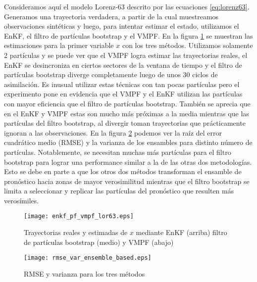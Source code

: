 Consideramos aquí el modelo Lorenz-63 descrito por las ecuaciones \ref{eq:lorenz63}. Generamos una trayectoria verdadera, a partir de la cual muestreamos observaciones sintéticas y luego, para intentar estimar el estado, utilizamos el EnKF, el filtro de partículas bootstrap y el VMPF. En la figura \ref{fig:enkf_pf_vmpf_lor63} se muestran las estimaciones para la primer variable $x$ con los tres métodos. Utilizamos solamente 2 partículas y se puede ver que el VMPF logra estimar las trayectorias reales, el EnKF se desincroniza en ciertos sectores de la ventana de tiempo y el filtro de partículas bootstrap diverge completamente luego de unos 30 ciclos de asimilación. Es inusual utilizar estas técnicas con tan pocas partículas pero el experimento pone en evidencia que el VMPF y el EnKF utilizan las partículas con mayor eficiencia que el filtro de partículas bootstrap. También se aprecia que en el EnKF y VMPF estas son mucho más próximas a la media mientras que las partículas del filtro bootstrap, al divergir toman trayectorias que prácticamente ignoran a las observaciones. En la figura \ref{fig:rmse_var_ensemble_based} podemos ver la raíz del error cuadrático medio (RMSE) y la varianza de los ensambles para distinto número de partículas. Notablemente, se necesitan muchas más partículas para el filtro bootstrap para lograr una performance similar a la de las otras dos metodologías. Esto se debe en parte a que los otros dos métodos transforman el ensamble de pronóstico hacia zonas de mayor verosimilitud mientras que el filtro bootstrap se limita a seleccionar y replicar las partículas del pronóstico que resulten más verosímiles.

\begin{figure}[h!]
    \centering
    \texttt{[image: enkf\_pf\_vmpf\_lor63.eps]}
    \caption{Trayectorias reales y estimadas de $x$ mediante EnKF (arriba) filtro de partículas bootstrap (medio) y VMPF (abajo)}
    \label{fig:enkf_pf_vmpf_lor63}
\end{figure}

\begin{figure}[h!]
    \centering
    \texttt{[image: rmse\_var\_ensemble\_based.eps]}
    \caption{RMSE y varianza para los tres métodos}
    \label{fig:rmse_var_ensemble_based}
\end{figure}
